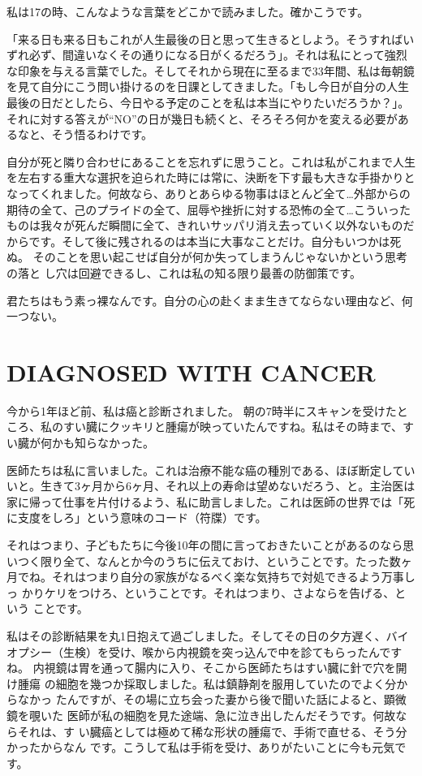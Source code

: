 \documentclass[a4paper,11pt,twocolumn]{jarticle}
\begin{document}
私は17の時、こんなような言葉をどこかで読みました。確かこうです。

「来る日も来る日もこれが人生最後の日と思って生きるとしよう。そうすればい
ずれ必ず、間違いなくその通りになる日がくるだろう」。それは私にとって強烈
な印象を与える言葉でした。そしてそれから現在に至るまで33年間、私は毎朝鏡
を見て自分にこう問い掛けるのを日課としてきました。「もし今日が自分の人生
最後の日だとしたら、今日やる予定のことを私は本当にやりたいだろうか？」。
それに対する答えが“NO”の日が幾日も続くと、そろそろ何かを変える必要があ
るなと、そう悟るわけです。

自分が死と隣り合わせにあることを忘れずに思うこと。これは私がこれまで人生
を左右する重大な選択を迫られた時には常に、決断を下す最も大きな手掛かりと
なってくれました。何故なら、ありとあらゆる物事はほとんど全て…外部からの
期待の全て、己のプライドの全て、屈辱や挫折に対する恐怖の全て…こういった
ものは我々が死んだ瞬間に全て、きれいサッパリ消え去っていく以外ないものだ
からです。そして後に残されるのは本当に大事なことだけ。自分もいつかは死ぬ。
そのことを思い起こせば自分が何か失ってしまうんじゃないかという思考の落と
し穴は回避できるし、これは私の知る限り最善の防御策です。

君たちはもう素っ裸なんです。自分の心の赴くまま生きてならない理由など、何
一つない。

\section{DIAGNOSED WITH CANCER}

今から1年ほど前、私は癌と診断されました。 朝の7時半にスキャンを受けたと
ころ、私のすい臓にクッキリと腫瘍が映っていたんですね。私はその時まで、す
い臓が何かも知らなかった。

医師たちは私に言いました。これは治療不能な癌の種別である、ほぼ断定してい
いと。生きて3ヶ月から6ヶ月、それ以上の寿命は望めないだろう、と。主治医は
家に帰って仕事を片付けるよう、私に助言しました。これは医師の世界では「死
に支度をしろ」という意味のコード（符牒）です。

それはつまり、子どもたちに今後10年の間に言っておきたいことがあるのなら思
いつく限り全て、なんとか今のうちに伝えておけ、ということです。たった数ヶ
月でね。それはつまり自分の家族がなるべく楽な気持ちで対処できるよう万事しっ
かりケリをつけろ、ということです。それはつまり、さよならを告げる、という
ことです。

私はその診断結果を丸1日抱えて過ごしました。そしてその日の夕方遅く、バイ
オプシー（生検）を受け、喉から内視鏡を突っ込んで中を診てもらったんですね。
内視鏡は胃を通って腸内に入り、そこから医師たちはすい臓に針で穴を開け腫瘍
の細胞を幾つか採取しました。私は鎮静剤を服用していたのでよく分からなかっ
たんですが、その場に立ち会った妻から後で聞いた話によると、顕微鏡を覗いた
医師が私の細胞を見た途端、急に泣き出したんだそうです。何故ならそれは、す
い臓癌としては極めて稀な形状の腫瘍で、手術で直せる、そう分かったからなん
です。こうして私は手術を受け、ありがたいことに今も元気です。
\end{document}
